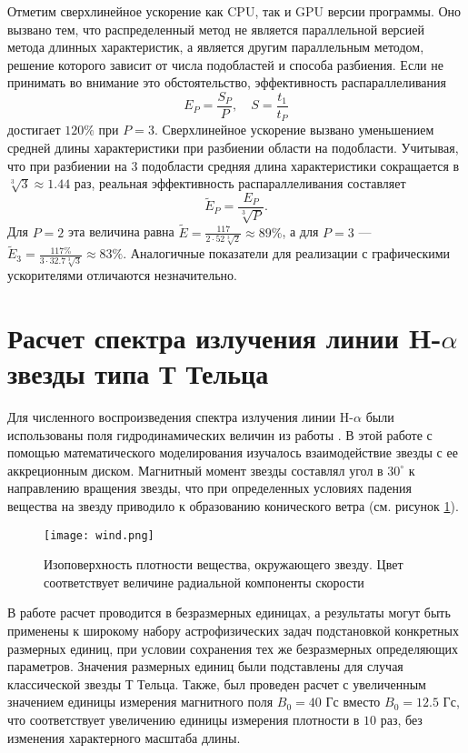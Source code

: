 Отметим сверхлинейное ускорение как CPU, так и GPU версии программы. Оно вызвано тем, что распределенный метод не является параллельной версией метода длинных характеристик, а является другим параллельным методом, решение которого зависит от числа подобластей и способа разбиения. Если не принимать во внимание это обстоятельство, эффективность распараллеливания
\[
E_P = \frac{S_P}{P}, \quad S = \frac{t_1}{t_P}
\]
достигает $120 \%$ при $P = 3$. Сверхлинейное ускорение вызвано уменьшением средней длины характеристики при разбиении области на подобласти. Учитывая, что при разбиении на $3$ подобласти средняя длина характеристики сокращается в $\sqrt[3]{3} \approx 1.44$ раз, реальная эффективность распараллеливания составляет 
\[
\tilde E_P = \frac{E_P}{\sqrt[3]{P}}.
\]
Для $P=2$ эта величина равна $\tilde E = \frac{117}{2 \cdot 52 \sqrt[3]{2}} \approx 89 \%$, а для $P = 3$ --- $\tilde E_3 = \frac{117 \%}{3 \cdot 32.7\sqrt[3]{3}} \approx 83 \%$. Аналогичные показатели для реализации с графическими ускорителями отличаются незначительно.

\section{Расчет спектра излучения линии H-$\alpha$ звезды типа Т Тельца}

Для численного воспроизведения спектра излучения линии H-$\alpha$ были использованы поля гидродинамических величин из работы \cite{romanova2009}. В этой работе с помощью математического моделирования изучалось взаимодействие звезды с ее аккреционным диском. Магнитный момент звезды составлял угол в $30^\circ$ к направлению вращения звезды, что при определенных условиях падения вещества на звезду приводило к образованию конического ветра (см. рисунок \ref{fig:wind}).
\begin{figure}[ht!]
\centering
\texttt{[image: wind.png]}
\caption{Изоповерхность плотности вещества, окружающего звезду. Цвет соответствует величине радиальной компоненты скорости}
\label{fig:wind}
\end{figure}

В работе \cite{romanova2009} расчет проводится в безразмерных единицах, а результаты могут быть применены к широкому набору астрофизических задач подстановкой конкретных размерных единиц, при условии сохранения тех же безразмерных определяющих параметров. Значения размерных единиц были подставлены для случая классической звезды Т Тельца. Также, был проведен расчет с увеличенным значением единицы измерения магнитного поля $B_0 = 40 \text{ Гс}$ вместо $B_0 = 12.5 \text{ Гс}$, что соответствует увеличению единицы измерения плотности в $10$ раз, без изменения характерного масштаба длины. 

